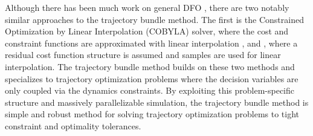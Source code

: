 Although there has been much work on general DFO \cite{conn1997, kochenderfer2019,conn2009}, there are two notably similar approaches to the trajectory bundle method. The first is the Constrained Optimization by Linear Interpolation (COBYLA) solver, where the cost and constraint functions are approximated with linear interpolation \cite{powell1994}, and \cite{cartis2019}, where a residual cost function structure is assumed and samples are used for linear interpolation. The trajectory bundle method builds on these two methods and specializes to trajectory optimization problems where the decision variables are only coupled via the dynamics constraints. By exploiting this problem-specific structure and massively parallelizable simulation, the trajectory bundle method is  simple and robust method for solving trajectory optimization problems to tight constraint and optimality tolerances.





